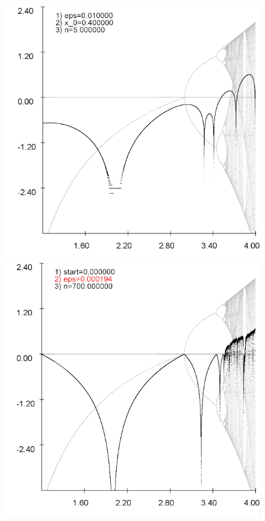 \documentclass{scrartcl}
\begin{document}
\begin{figure}
\includegraphics[scale=0.28]{iteration/lyapunov-1}
\includegraphics[scale=0.28]{iteration/lyapunov-2}

\end{figure}
\end{document}
